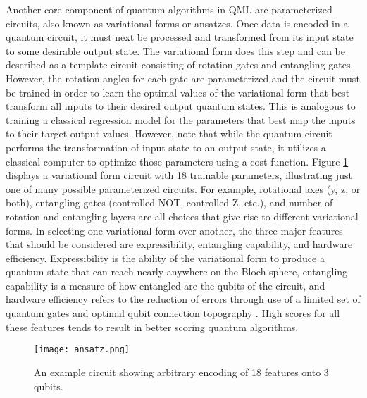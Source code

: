 \documentclass[
	a4paper, %
	10pt, %
	unnumberedsections, %
	twoside, %
]{LTJournalArticle}
\begin{document}
Another core component of quantum algorithms in QML are parameterized circuits, also known as variational forms or ansatzes. Once data is encoded in a quantum circuit, it must next be 
processed and transformed from its input state to some desirable output state. The variational form does this step and can be described as a template circuit consisting of rotation gates and 
entangling gates. However, the rotation angles for each gate are parameterized and the circuit must be trained in order to learn the optimal values of the variational form that best transform 
all inputs to their desired output quantum states. This is analogous to training a classical regression model for the parameters that best map the inputs to their target output values. 
However, note that while the quantum circuit performs the transformation of input state to an output state, it utilizes a classical computer to optimize those parameters using a cost function. 
Figure \ref{fig:ansatz} displays a variational form circuit with 18 trainable parameters, illustrating just one of many possible parameterized circuits. For example, rotational axes (y, z, or both), 
entangling gates (controlled-NOT, controlled-Z, etc.), and number of rotation and entangling layers are all choices that give rise to different variational forms. In selecting one variational 
form over another, the three major features that should be considered are expressibility, entangling capability, and hardware efficiency. Expressibility is the ability of the variational form 
to produce a quantum state that can reach nearly anywhere on the Bloch sphere, entangling capability is a measure of how entangled are the qubits of the circuit, and hardware efficiency 
refers to the reduction of errors through use of a limited set of quantum gates and optimal qubit connection topography \autocite{qiskitextbook2023}. High scores for all these features tends 
to result in better scoring quantum algorithms.

\begin{figure} %
	\texttt{[image: ansatz.png]}
	\caption{An example circuit showing arbitrary encoding of 18 features onto 3 qubits.}
	\label{fig:ansatz}
\end{figure}
\end{document}
